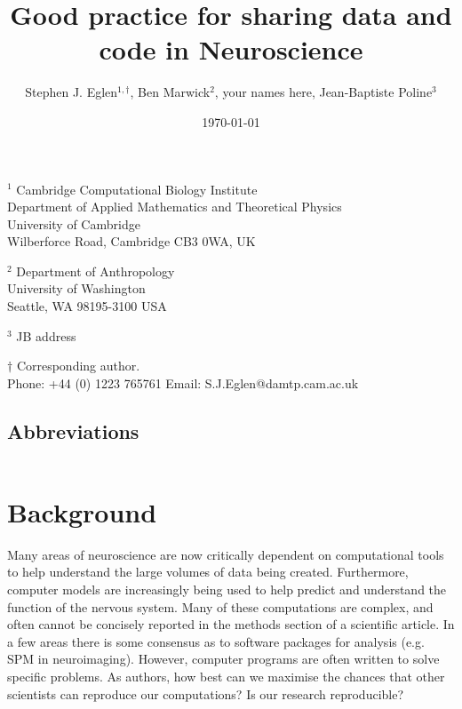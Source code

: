 \documentclass[11pt]{article}
\begin{document}
\doublespacing

\title{Good practice for sharing data and code in Neuroscience}

\author{Stephen J. Eglen$^{1,\dagger}$, Ben Marwick${^2}$, your names here, Jean-Baptiste Poline${^3}$}
\date{\today}
\maketitle

\noindent $^{1}$ 
Cambridge Computational Biology Institute\\
Department of Applied Mathematics and Theoretical Physics\\
University of Cambridge\\
Wilberforce Road, Cambridge CB3 0WA, UK
\vspace*{2mm}

\noindent $^{2}$ 
Department of Anthropology\\
University of Washington\\
Seattle, WA 98195-3100 USA 
\vspace*{2mm}

\noindent $^3$ JB address

\vspace*{2mm}


\noindent $\dagger$
Corresponding author.\\
\noindent Phone: +44 (0) 1223 765761
\noindent Email: S.J.Eglen@damtp.cam.ac.uk



\vspace*{2cm}
\subsection*{Abbreviations}
\begin{tabular}{ll}
\end{tabular}


\clearpage


\renewcommand{\cite}[1]{\autocite{#1}}

\linenumbers

\section*{Background}

Many areas of neuroscience are now critically dependent on
computational tools to help understand the large volumes of data being
created.  Furthermore, computer models are increasingly being used to
help predict and understand the function of the nervous system.  Many
of these computations are complex, and often cannot be concisely
reported in the methods section of a scientific article.  In a few
areas there is some consensus as to software packages for analysis
(e.g. SPM in neuroimaging).  However, computer programs are often
written to solve specific problems.  As authors, how best can we
maximise the chances that other scientists can reproduce our
computations?  Is our research reproducible?
\end{document}
